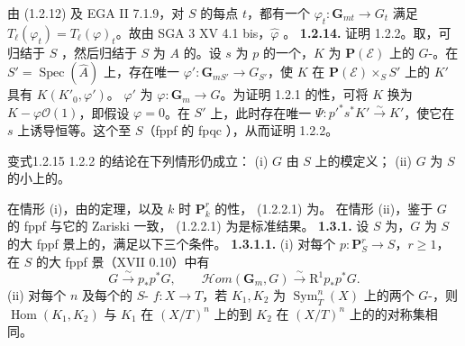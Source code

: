 由 (1.2.12) 及 EGA II 7.1.9，对 $S$ 的每点 $t$，都有一个 $\varphi_t:\mathbf G_{mt}\to G_t$ 满足 $T_\ell(\varphi_t)=T_\ell(\varphi)_t$。故由 SGA 3 XV 4.1 bis，$\widehat\varphi$ 。
\textbf{1.2.14.} 证明 1.2.2。取，可归结于 $S$ ，然后归结于 $S$ 为 $A$ 的。设 $s$ 为 $p$ 的一个，$K$ 为 $\mathbf P(\mathscr E)$ 上的 $G$-。在 $S'=\operatorname{Spec}(\widehat A)$ 上，存在唯一 $\varphi':\mathbf G_{mS'}\to G_{S'}$，使 $K$ 在 $\mathbf P(\mathscr E)\times_S S'$ 上的 $K'$ 具有 $K(K'_0,\varphi')$。 $\varphi'$ 为 $\varphi:\mathbf G_m\to G$。为证明 1.2.1 的性，可将 $K$ 换为 $K-\varphi\mathscr O(1)$，即假设 $\varphi=0$。在 $S'$ 上，此时存在唯一 $\Psi:p'^*s^*K'\xrightarrow\sim K'$，使它在 $s$ 上诱导恒等。这个至 $S$（fppf 的 fpqc ），从而证明 1.2.2。
\begin{SGAresult}{变式}{1.2.15}
1.2.2 的结论在下列情形仍成立：
(i) $G$ 由 $S$ 上的模定义；
(ii) $G$ 为 $S$ 的小上的。
\end{SGAresult}
在情形 (i)，由的定理，以及 $k$ 时 $\mathbf P^r_k$ 的性， (1.2.2.1) 为。
在情形 (ii)，鉴于 $G$ 的 fppf 与它的 Zariski 一致， (1.2.2.1) 为是标准结果。
\textbf{1.3.1.} 设 $S$ 为，$G$ 为 $S$ 的大 fppf 景上的，满足以下三个条件。
\textbf{1.3.1.1.}
(i) 对每个 $p:\mathbf P^r_S\to S$，$r\geq1$，在 $S$ 的大 fppf 景（XVII 0.10）中有
\[G\xrightarrow\sim p_*p^*G,\qquad\mathscr Hom(\mathbf G_m,G)\xrightarrow\sim\mathrm R^1p_*p^*G.\]
(ii) 对每个 $n$ 及每个的 $S$- $f:X\to T$，若 $K_1,K_2$ 为 $\operatorname{Sym}^n_T(X)$ 上的两个 $G$-，则 $\operatorname{Hom}(K_1,K_2)$ 与 $K_1$ 在 $(X/T)^n$ 上的到 $K_2$ 在 $(X/T)^n$ 上的的对称集相同。

